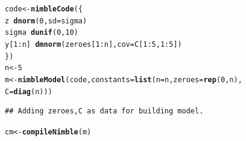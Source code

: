 \documentclass[12pt,oneside]{book}\usepackage[]{graphicx}\usepackage[]{color}
\makeatletter
\newcommand{\hlnum}[1]{\textcolor[rgb]{0.686,0.059,0.569}{#1}}%
\newcommand{\hlopt}[1]{\textcolor[rgb]{0,0,0}{#1}}%
\newcommand{\hlstd}[1]{\textcolor[rgb]{0.345,0.345,0.345}{#1}}%
\newcommand{\hlkwb}[1]{\textcolor[rgb]{0.69,0.353,0.396}{#1}}%
\newcommand{\hlkwc}[1]{\textcolor[rgb]{0.333,0.667,0.333}{#1}}%
\newcommand{\hlkwd}[1]{\textcolor[rgb]{0.737,0.353,0.396}{\textbf{#1}}}%
\newenvironment{kframe}{%
 \def\at@end@of@kframe{}%
 \ifinner\ifhmode%
  \def\at@end@of@kframe{\end{minipage}}%
  \begin{minipage}{\columnwidth}%
 \fi\fi%
 \def\FrameCommand##1{\hskip\@totalleftmargin \hskip-\fboxsep
 \colorbox{shadecolor}{##1}\hskip-\fboxsep
     \hskip-\linewidth \hskip-\@totalleftmargin \hskip\columnwidth}%
 \MakeFramed {\advance\hsize-\width
   \@totalleftmargin\z@ \linewidth\hsize
   \@setminipage}}%
 {\par\unskip\endMakeFramed%
 \at@end@of@kframe}
\newenvironment{knitrout}{}{} %
\makeatother
\begin{document}
\begin{knitrout}
\color{fgcolor}\begin{kframe}
\begin{alltt}
\hlstd{code} \hlkwb{<-} \hlkwd{nimbleCode}\hlstd{(\{}
    \hlstd{z} \hlopt{~} \hlkwd{dnorm}\hlstd{(}\hlnum{0}\hlstd{,} \hlkwc{sd} \hlstd{= sigma)}
    \hlstd{sigma} \hlopt{~} \hlkwd{dunif}\hlstd{(}\hlnum{0}\hlstd{,} \hlnum{10}\hlstd{)}
    \hlstd{y[}\hlnum{1}\hlopt{:}\hlstd{n]} \hlopt{~} \hlkwd{dmnorm}\hlstd{(zeroes[}\hlnum{1}\hlopt{:}\hlstd{n],} \hlkwc{cov} \hlstd{= C[}\hlnum{1}\hlopt{:}\hlnum{5}\hlstd{,} \hlnum{1}\hlopt{:}\hlnum{5}\hlstd{])}
\hlstd{\})}
\hlstd{n} \hlkwb{<-} \hlnum{5}
\hlstd{m} \hlkwb{<-} \hlkwd{nimbleModel}\hlstd{(code,} \hlkwc{constants} \hlstd{=} \hlkwd{list}\hlstd{(}\hlkwc{n} \hlstd{= n,} \hlkwc{zeroes} \hlstd{=} \hlkwd{rep}\hlstd{(}\hlnum{0}\hlstd{, n),}
                                        \hlkwc{C} \hlstd{=} \hlkwd{diag}\hlstd{(n)))}
\end{alltt}
\begin{verbatim}
## Adding zeroes,C as data for building model.
\end{verbatim}
\begin{alltt}
\hlstd{cm} \hlkwb{<-} \hlkwd{compileNimble}\hlstd{(m)}


\end{alltt}
\end{kframe}
\end{knitrout}
\end{document}

